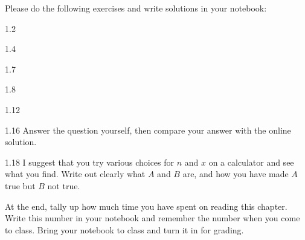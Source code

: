 Please do the following exercises and write solutions in your notebook:

1.2

1.4 

1.7

1.8

1.12 

1.16 Answer the question yourself, then compare your answer with the online solution.

1.18 I suggest that you try various choices for $n$ and $x$ on a calculator and see what you find.  Write out clearly what $A$ and $B$ are, and how you have made $A$ true but $B$ not true.


At the end, tally up how much time you have spent on reading this chapter.
Write this number in your notebook and remember the number when you come to class.
Bring your notebook to class and turn it in for grading.

